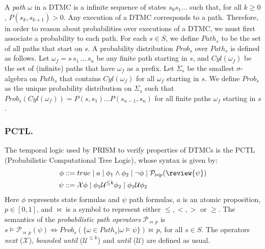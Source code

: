 A \emph{path} $\omega$ in a DTMC is a infinite sequence of states $s_0s_1...$ 
such that, for all $k \geq 0$, $P(s_k,s_{k+1})>0$. 
Any execution of a DTMC corresponds to a path. 
Therefore, in order to reason about probabilities over executions of a DTMC, 
we must first associate a probability to each path.
%
For each $s \in S$, we define $Path_s$ to be the set of all paths that start 
on $s$. 
A probability distribution $Prob_s$ over $Path_s$ is defined as follows. 
Let $\omega_f=s \,s_1 \,... \,s_n$ be any finite path starting in $s$, and $Cyl(\omega_f)$ 
be the set of (infinite) paths that have $\omega_f$ as a prefix. 
Let $\Sigma_s$ be the smallest $\sigma$-algebra on $Path_s$ that contains $Cyl(\omega_f)$ for all $\omega_f$ starting in $s$. We define $Prob_s$ as the unique probability distribution on $\Sigma_s$ such that $Prob_s(Cyl(\omega_f))=P(s,s_1)...P(s_{n-1},s_n)$ for all finite 
paths $\omega_f$ starting in $s$. 

\subsubsection{PCTL.} 
The temporal logic used by PRISM to verify properties of DTMCs is the PCTL 
(Probabilistic Computational Tree Logic), 
whose syntax is given by:
\begin{align*}
\phi &::= true \; | \; a \; | \; \phi_1 \wedge \phi_2  \; | \; \neg \phi  \; | \;  \mathcal{P}_{\bowtie p}(\review{\psi})\\
\psi &::= \mathcal{X}\phi  \; | \;  \phi_1 \mathcal{U}^{\leq k} \phi_2  \; | \;\phi_1 \mathcal{U} \phi_2  
\end{align*}
Here $\phi$ represents state formulas and $\psi$ path formulas, 
$a$ is an atomic proposition, $p \in [0,1]$, and $\bowtie$ is a symbol 
to represent either $\leq,<,>$ or $\geq$. 
The semantics of the \emph{probabilistic path operators} 
$\mathcal{P}_{\bowtie \, p}$ 
is 
$s\models \mathcal{P}_{\bowtie \, p}(\psi) \Leftrightarrow Prob_s(\{\omega \in Path_s | \omega \models \psi\} ) \bowtie \, p $, for all $s \in S$.  
The operators \emph{next} ($\mathcal{X}$), 
\emph{bounded until} ($\mathcal{U}^{\leq k}$) 
and \emph{until} ($\mathcal{U}$) are defined as usual. 


